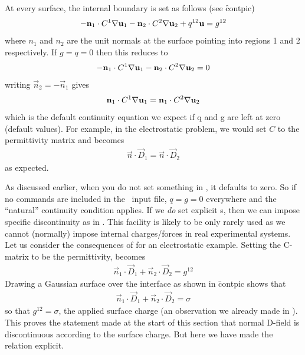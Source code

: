 \documentclass[a4paper,twoside,11pt]{book}
\begin{document}
At every surface, the internal boundary is set as follows (see
\f{contpic})
\begin{eqnarray}
  -\mathbf{n}_1\cdot C^1\nabla \mathbf{u}_1- \mathbf{n}_2\cdot C^2\nabla \mathbf{u}_2+q^{12}\mathbf{u}=g^{12}
\label{continuity}
\end{eqnarray}
where $n_1$ and $n_2$ are the unit normals at the surface pointing
into regions 1 and 2 respectively. If $g=q=0$ then this reduces to
\begin{eqnarray}
  -\mathbf{n}_1\cdot C^1\nabla \mathbf{u}_1- \mathbf{n}_2\cdot C^2\nabla \mathbf{u}_2=0
\end{eqnarray}
writing $\vec n_2=-\vec n_1$ gives
\begin{eqnarray}
  \mathbf{n}_1\cdot C^1\nabla \mathbf{u}_1= \mathbf{n}_1\cdot C^2\nabla \mathbf{u}_2
\label{natcont}
\end{eqnarray}
which is the default continuity equation we expect if q and g are left
at zero (default values). For example, in the electrostatic problem,
we would set $C$ to the permittivity matrix and 
becomes
\begin{eqnarray}
  \vec n\cdot\vec D_1=\vec n\cdot\vec D_2
\end{eqnarray}
as expected.

As discussed earlier, when you do not set something in \zinc, it
defaults to zero. So if no  commands are included in the
\zinc\ input file, $q=g=0$ everywhere and the ``natural'' continuity
condition  applies. If we \emph{do} set explicit
s, then we can impose specific discontinuity as in
. This facility is likely to be only rarely used as we
cannot (normally) impose internal charges/forces in real experimental
systems. Let us consider the consequences of  for an
electrostatic example. Setting the C-matrix to be the permittivity,
 becomes
\begin{eqnarray}
\vec n_1\cdot\vec D_1 +\vec n_2\cdot\vec D_2 = g^{12}
\end{eqnarray}
Drawing a Gaussian surface over the interface as shown in \f{contpic}
shows that
\begin{eqnarray}
  \vec n_1\cdot\vec D_1 +\vec n_2\cdot\vec D_2 = \sigma
\end{eqnarray}
so that $g^{12}=\sigma$, the applied surface charge (an observation we
already made in ). This proves the statement made at
the start of this section that normal D-field is discontinuous
according to the surface charge. But here we have made the relation
explicit.
\end{document}
